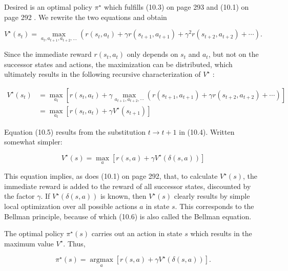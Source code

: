 \documentclass[10pt]{book}
\begin{document}
Desired is an optimal policy $\pi^{\star}$ which fulfills (10.3) on page 293 and (10.1) on page 292 . We rewrite the two equations and obtain


\begin{equation*}
V^{\star}\left(s_{t}\right)=\max _{a_{t}, a_{t+1}, a_{t+2}, \ldots}\left(r\left(s_{t}, a_{t}\right)+\gamma r\left(s_{t+1}, a_{t+1}\right)+\gamma^{2} r\left(s_{t+2}, a_{t+2}\right)+\cdots\right) . \tag{10.4}
\end{equation*}


Since the immediate reward $r\left(s_{t}, a_{t}\right)$ only depends on $s_{t}$ and $a_{t}$, but not on the successor states and actions, the maximization can be distributed, which ultimately results in the following recursive characterization of $V^{\star}$ :


\begin{align*}
V^{\star}\left(s_{t}\right) & =\max _{a_{t}}\left[r\left(s_{t}, a_{t}\right)+\gamma \max _{a_{t+1}, a_{t+2}, \cdots}\left(r\left(s_{t+1}, a_{t+1}\right)+\gamma r\left(s_{t+2}, a_{t+2}\right)+\cdots\right)\right] \\
& =\max _{a_{t}}\left[r\left(s_{t}, a_{t}\right)+\gamma V^{\star}\left(s_{t+1}\right)\right] \tag{10.5}
\end{align*}


Equation (10.5) results from the substitution $t \rightarrow t+1$ in (10.4). Written somewhat simpler:


\begin{equation*}
V^{\star}(s)=\max _{a}\left[r(s, a)+\gamma V^{\star}(\delta(s, a))\right] \tag{10.6}
\end{equation*}


This equation implies, as does (10.1) on page 292, that, to calculate $V^{\star}(s)$, the immediate reward is added to the reward of all successor states, discounted by the factor $\gamma$. If $V^{\star}(\delta(s, a))$ is known, then $V^{\star}(s)$ clearly results by simple local optimization over all possible actions $a$ in state $s$. This corresponds to the Bellman principle, because of which (10.6) is also called the Bellman equation.

The optimal policy $\pi^{\star}(s)$ carries out an action in state $s$ which results in the maximum value $V^{\star}$. Thus,



\begin{equation*}
\pi^{\star}(s)=\underset{a}{\operatorname{argmax}}\left[r(s, a)+\gamma V^{\star}(\delta(s, a))\right] . \tag{10.7}
\end{equation*}
\end{document}
